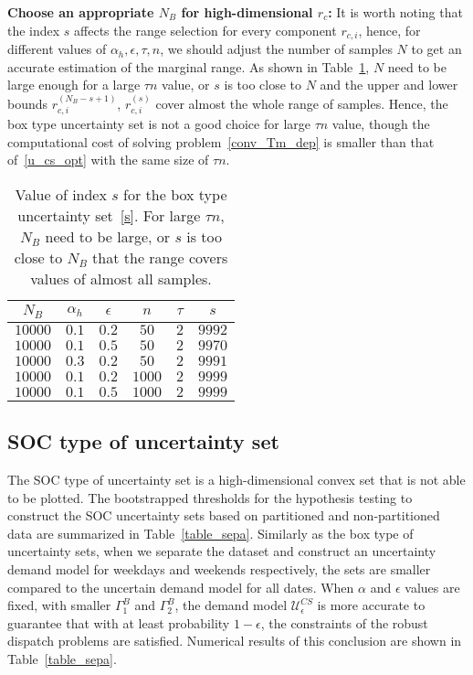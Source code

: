 \documentclass[10pt,twocolumn,twoside,english]{IEEEtran}
\begin{document}
\textbf{Choose an appropriate $N_B$ for high-dimensional $r_c$:}
It is worth noting that the index $s$ affects the range selection for every component $r_{c,i}$, hence, for different values of $\alpha_h, \epsilon, \tau, n$, we should adjust the number of samples $N$ to get an accurate estimation of the marginal range. As shown in Table~\ref{table_nt},  $N$ need to be large enough for a large $\tau n$ value, or $s$ is too close to $N$ and the upper and lower bounds ${r}_{c,i}^{(N_B-s+1)}$, ${r}_{c,i}^{(s)}$ cover almost the whole range of samples. Hence, the box type uncertainty set is not a good choice for large $\tau n$ value, though the computational cost of solving problem~\eqref{conv_Tm_dep} is smaller than that of~\eqref{u_cs_opt} with the same size of $\tau n$.
\begin{table}[t!]
\centering
\begin{tabular}{|c|c|c|c|c|c|}
  \hline
   $N_B$              & $\alpha_h$     &$\epsilon$      & $n$            &$\tau$             & $s$ \\ \hline
$10000$          &$0.1$            &$0.2$             &  $50$        & $2$      & $9992$ \\ \hline
$10000$          &$0.1$            &$0.5$             &  $50$        & $2$      & $9970$   \\ \hline
$10000$          &$0.3$            &$0.2$             &  $50$        & $2$      & $9991$ \\ \hline
$10000$          &$0.1$            &$0.2$             &  $1000$    & $2$      & $9999$   \\ \hline
$10000$          &$0.1$            &$0.5$             &  $1000$        & $2$   & $9999$  \\ \hline
 \end{tabular}
     \caption{Value of index $s$ for the box type uncertainty set~\eqref{s}. For large $\tau n$, $N_B$ need to be large, or $s$ is too close to $N_B$ that the range covers values of almost all samples.}
     \label{table_nt}
    \vspace{-15pt}
\end{table}




\subsection{SOC type of uncertainty set}
The SOC type of uncertainty set is a high-dimensional convex set that is not able to be plotted. The bootstrapped thresholds for the hypothesis testing to construct the SOC uncertainty sets based on partitioned and non-partitioned data are summarized in Table~\ref{table_sepa}. Similarly as the box type of uncertainty sets, when we separate the dataset and construct an uncertainty demand model for weekdays and weekends respectively, the sets are smaller compared to the uncertain demand model for all dates. When $\alpha$ and $\epsilon$ values are fixed, with smaller $\Gamma_1^B$ and $\Gamma_2^B$, the demand model $\mathcal{U}_{\epsilon}^{CS}$ is more accurate to guarantee that with at least probability $1-\epsilon$, the constraints of the robust dispatch problems are satisfied. Numerical results of this conclusion are shown in Table~\ref{table_sepa}. 
\end{document}
